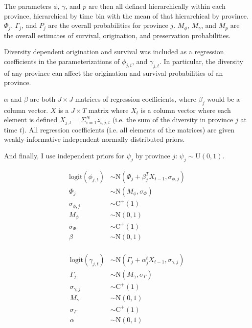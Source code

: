 \documentclass[12pt,letterpaper]{article}
\begin{document}
The parameters \(\phi\), \(\gamma\), and \(p\) are then all defined hierarchically within each province, hierarchical by time bin with the mean of that hierarchical by province. \(\Phi_{j}\), \(\Gamma_{j}\), and \(P_{j}\) are the overall probabilities for province \(j\). \(M_{\phi}\), \(M_{\gamma}\), and \(M_{p}\) are the overall estimates of survival, origination, and preservation probabilities. 

Diversity dependent origination and survival was included as a regression coefficients in the parameterizations of \(\phi_{j, t}\), and \(\gamma_{j, t}\). In particular, the diversity of any province can affect the origination and survival probabilities of an province. %

\(\alpha\) and \(\beta\) are both \(J \times J\) matrices of regression coefficients, where \(\beta_{j}\) would be a column vector. \(X\) is a \(J \times T\) matrix where \(X_{t}\) is a column vector where each element is defined \(X_{j, t} = \Sigma_{i = 1}^{N} z_{i, j, t}\) (i.e. the sum of the diversity in province \(j\) at time \(t\)). All regression coefficients (i.e. all elements of the matrices) are given weakly-informative independent normally distributed priors.

And finally, I use independent priors for \(\psi_{j}\) by province \(j\): \(\psi_{j} \sim \mathrm{U}(0, 1)\).

\begin{equation}
  \begin{aligned}
    \mathrm{logit}(\phi_{j, t}) &\sim \mathrm{N}(\Phi_{j} + \beta_{j}^{T}X_{t - 1}, \sigma_{\phi, j}) \\
    \Phi_{j} &\sim \mathrm{N}(M_{\phi}, \sigma_{\Phi}) \\
    \sigma_{\phi, j} &\sim \mathrm{C}^{+}(1) \\
    M_{\phi} &\sim \mathrm{N}(0, 1) \\
    \sigma_{\Phi} &\sim \mathrm{C}^{+}(1) \\
    \beta &\sim \mathrm{N}(0, 1) \\
  \end{aligned}
\end{equation}

\begin{equation}
  \begin{aligned}
    \mathrm{logit}(\gamma_{j, t}) &\sim \mathrm{N}(\Gamma_{j} + \alpha_{j}^{t}X_{t - 1}, \sigma_{\gamma, j}) \\
    \Gamma_{j} &\sim \mathrm{N}(M_{\gamma}, \sigma_{\Gamma}) \\
    \sigma_{\gamma, j} &\sim \mathrm{C}^{+}(1) \\
    M_{\gamma} &\sim \mathrm{N}(0, 1) \\
    \sigma_{\Gamma} &\sim \mathrm{C}^{+}(1) \\
    \alpha &\sim \mathrm{N}(0, 1) \\
  \end{aligned}
\end{equation}
\end{document}
